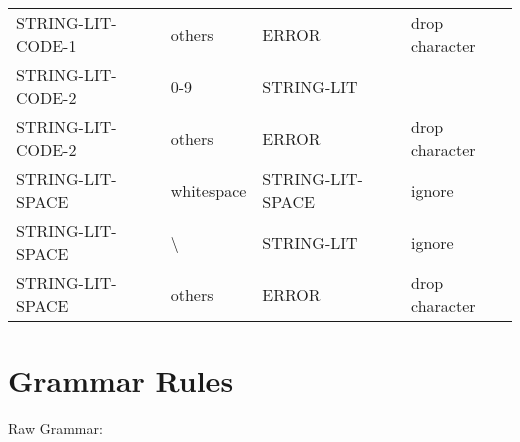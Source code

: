 \documentclass[11pt, fleqn]{article}
\begin{document}
\begin{longtable}{l|l|l|l}
STRING-LIT-CODE-1	&	others					&	ERROR			&	drop character				\\
STRING-LIT-CODE-2	&	0-9						&	STRING-LIT		&								\\
STRING-LIT-CODE-2	&	others					&	ERROR			&	drop character				\\
STRING-LIT-SPACE		&	whitespace				&	STRING-LIT-SPACE		& ignore							\\
STRING-LIT-SPACE		&	\textbackslash			&	STRING-LIT			& ignore							\\
STRING-LIT-SPACE		&	others					&	ERROR				& drop character				\\
\end{longtable}

\section{Grammar Rules}

Raw Grammar:
\end{document}
